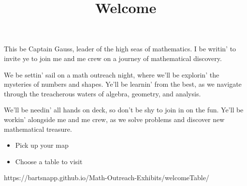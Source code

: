 \documentclass{../exhibit}
\title{Welcome}
\begin{document}
\begin{context}
This be Captain Gauss, leader of the high seas of mathematics. I be writin' to invite ye to join me and me crew on a journey of mathematical discovery.

We be settin' sail on a math outreach night, where we'll be explorin' the mysteries of numbers and shapes. Ye'll be learnin' from the best, as we navigate through the treacherous waters of algebra, geometry, and analysis.

We'll be needin' all hands on deck, so don't be shy to join in on the fun. Ye'll be workin' alongside me and me crew, as we solve problems and discover new mathematical treasure.
\end{context}

\begin{directions}
  \begin{itemize}
  \item Pick up your map
  \item Choose a table to visit
  \end{itemize}
\end{directions}

\begin{example}
\end{example}

\begin{mathConnections}
  https://bartsnapp.github.io/Math-Outreach-Exhibits/welcomeTable/
\end{mathConnections}
\end{document}
